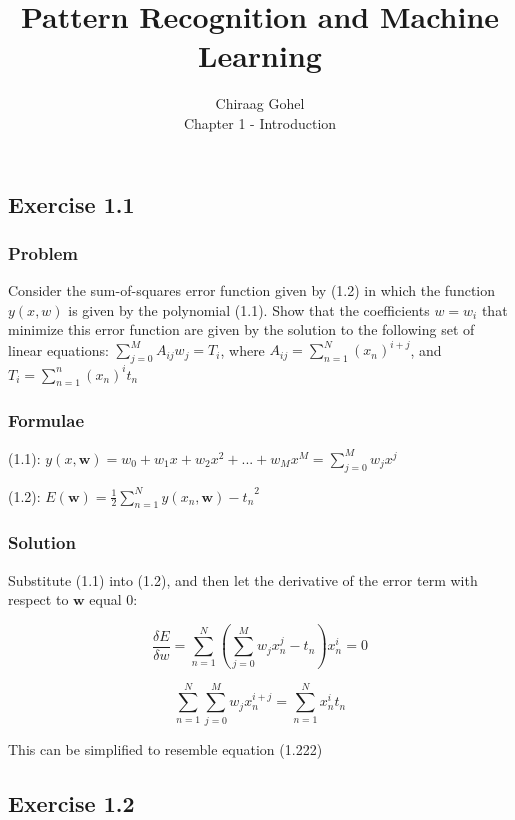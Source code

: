 \documentclass[12pt]{article}
\begin{document}
 
\title{Pattern Recognition and Machine Learning}
\author{Chiraag Gohel\\
Chapter 1 - Introduction}

\subsection*{Exercise 1.1} 

\subsubsection*{Problem}
Consider the sum-of-squares error function given by (1.2) in which the function $y(x,w)$ is given by the polynomial (1.1). Show that the coefficients $w = {w_i}$ that minimize this error function are given by the solution to the following set of linear equations: $\sum_{j=0}^M A_{ij}w_j = T_i$, where $A_{ij} = \sum_{n=1}^N (x_n)^{i+j}$, and $T_i = \sum_{n=1}^n (x_n)^i t_n$

\subsubsection*{Formulae}
(1.1): $y(x, \mathbf{w}) = w_0 + w_1x + w_2x^2 + ... + w_Mx^M = \sum_{j=0}^M w_jx^j$

(1.2): $E(\mathbf{w}) = \frac{1}{2}\sum_{n=1}^N {y(x_n, \mathbf{w}) - t_n}^2$

\subsubsection*{Solution}

Substitute (1.1) into (1.2), and then let the derivative of the error term with respect to $\mathbf{w}$ equal 0: 

$$\frac{\delta E}{\delta w} = \sum_{n=1}^N(\sum_{j=0}^M w_jx_n^j - t_n)x_n^i = 0$$

$$\sum_{n=1}^N\sum_{j=0}^M w_jx_n^{i+j} = \sum_{n=1}^N x_n^i t_n$$

This can be simplified to resemble equation (1.222)

\subsection*{Exercise 1.2}
\end{document}
